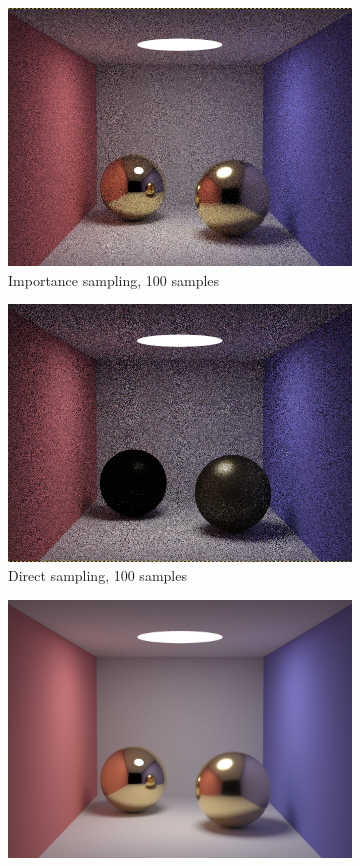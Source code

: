 \documentclass[12pt]{article}
\begin{document}
\begin{figure}
\centering
\begin{subfigure}{.5\textwidth}
  \centering
  \includegraphics[width=.9\linewidth]{IS100.png}
  \caption{Importance sampling, 100 samples}
  \label{fig:sub1}
\end{subfigure}%
\begin{subfigure}{.5\textwidth}
  \centering
  \includegraphics[width=.9\linewidth]{DS100.png}
  \caption{Direct sampling, 100 samples}
  \label{fig:sub2}
\end{subfigure}
\begin{subfigure}{.5\textwidth}
  \centering
  \includegraphics[width=.9\linewidth]{convergedIS.png}

\end{subfigure}
\end{figure}
\end{document}
